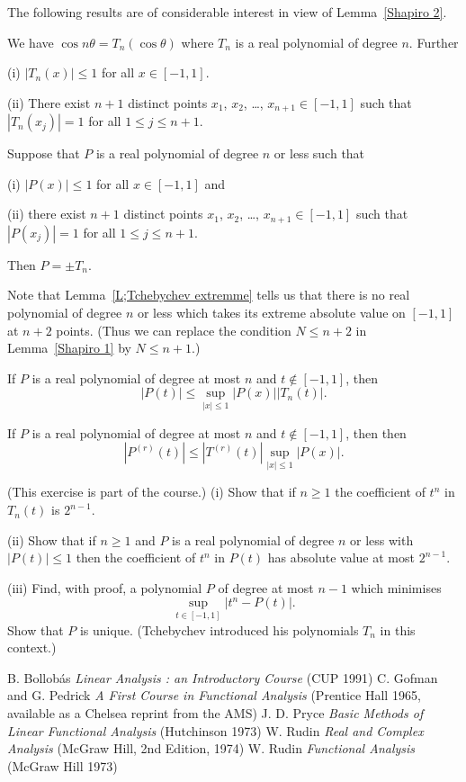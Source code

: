 The following
results are of considerable interest
in view of Lemma~\ref{Shapiro 2}.
\begin{lemma} We have $\cos n\theta=T_{n}(\cos\theta)$
where $T_{n}$ is a real polynomial of degree $n$.
Further

(i) $|T_{n}(x)|\leq 1$ for all $x\in [-1,1]$.

(ii) There exist $n+1$ 
distinct points $x_{1}$, $x_{2}$, \dots, $x_{n+1}\in[-1,1]$
such that $|T_{n}(x_{j})|=1$ for all $1\leq j\leq n+1$.
\end{lemma}
\begin{lemma}\label{L;Tchebychev extremme}
Suppose that $P$ is a real polynomial of degree
$n$ or less such that

(i) $|P(x)|\leq 1$ for all $x\in [-1,1]$ and

(ii) there exist $n+1$ 
distinct points $x_{1}$, $x_{2}$, \dots, $x_{n+1}\in[-1,1]$
such that $|P(x_{j})|=1$ for all $1\leq j\leq n+1$.

\noindent Then $P=\pm T_{n}$.
\end{lemma}
Note that Lemma~\ref{L;Tchebychev extremme} tells
us that there is no  real polynomial of degree
$n$ or less which takes its extreme absolute value
on $[-1,1]$ at $n+2$ points. (Thus we can replace the condition
$N\leq n+2$ in Lemma~\ref{Shapiro 1} by $N\leq n+1$.)
\begin{theorem}If
$P$ is a real polynomial of degree at most $n$
and $t\notin[-1,1]$, then
\[|P(t)|\leq \sup _{|x|\leq 1}|P(x)||T_{n}(t)|.\]
\end{theorem}
\begin{exercise} If
$P$ is a real polynomial of degree at most $n$
and $t\notin[-1,1]$, then
then
\[|P^{(r)}(t)|\leq |T^{(r)}(t)|\sup_{|x|\leq 1}|P(x)|.\]
\end{exercise}
\begin{exercise} (This exercise is part of the course.)
(i) Show that if $n\geq 1$ the coefficient of $t^{n}$ in
$T_{n}(t)$ is $2^{n-1}$.

(ii) Show that if $n\geq 1$ and $P$ is a real polynomial
of degree $n$ or less with $|P(t)|\leq 1$ then 
the coefficient of $t^{n}$ in
$P(t)$ has absolute value at most $2^{n-1}$.

(iii) Find, with proof, a polynomial $P$ of degree at
most $n-1$ which minimises
\[\sup_{t\in[-1,1]}|t^{n}-P(t)|.\]
Show that $P$ is unique. (Tchebychev introduced his polynomials
$T_{n}$ in this context.)
\end{exercise}

   
\begin{thebibliography}{9}
 B. Bollob\'as \emph{Linear Analysis
: an Introductory Course} (CUP 1991)
C. Gofman and G. Pedrick \emph{A First
Course in Functional Analysis} (Prentice Hall 1965,
available as a Chelsea reprint from the AMS)
 J. D. Pryce \emph{Basic Methods of Linear Functional
Analysis} (Hutchinson 1973)
W. Rudin \emph{Real and Complex Analysis} (McGraw Hill, 2nd Edition, 1974)
W. Rudin \emph{Functional Analysis} (McGraw Hill 1973)
\end{thebibliography}
